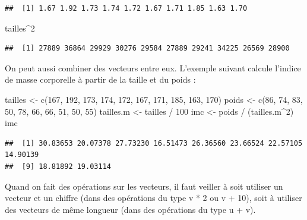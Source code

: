 \documentclass[
]{book}
\newenvironment{Shaded}{\begin{snugshade}}{\end{snugshade}}
\newcommand{\DecValTok}[1]{\textcolor[rgb]{0.00,0.00,0.81}{#1}}
\newcommand{\FunctionTok}[1]{\textcolor[rgb]{0.00,0.00,0.00}{#1}}
\newcommand{\NormalTok}[1]{#1}
\newcommand{\OtherTok}[1]{\textcolor[rgb]{0.56,0.35,0.01}{#1}}
\newcommand{\SpecialCharTok}[1]{\textcolor[rgb]{0.00,0.00,0.00}{#1}}
\begin{document}
\begin{verbatim}
##  [1] 1.67 1.92 1.73 1.74 1.72 1.67 1.71 1.85 1.63 1.70
\end{verbatim}

\begin{Shaded}
\begin{Highlighting}[]
\NormalTok{tailles}\SpecialCharTok{\^{}}\DecValTok{2}
\end{Highlighting}
\end{Shaded}

\begin{verbatim}
##  [1] 27889 36864 29929 30276 29584 27889 29241 34225 26569 28900
\end{verbatim}

On peut aussi combiner des vecteurs entre eux. L'exemple suivant calcule l'indice de masse corporelle à partir de la taille et du poids :

\begin{Shaded}
\begin{Highlighting}[]
\NormalTok{tailles }\OtherTok{\textless{}{-}} \FunctionTok{c}\NormalTok{(}\DecValTok{167}\NormalTok{, }\DecValTok{192}\NormalTok{, }\DecValTok{173}\NormalTok{, }\DecValTok{174}\NormalTok{, }\DecValTok{172}\NormalTok{, }\DecValTok{167}\NormalTok{, }\DecValTok{171}\NormalTok{, }\DecValTok{185}\NormalTok{, }\DecValTok{163}\NormalTok{, }\DecValTok{170}\NormalTok{)}
\NormalTok{poids }\OtherTok{\textless{}{-}} \FunctionTok{c}\NormalTok{(}\DecValTok{86}\NormalTok{, }\DecValTok{74}\NormalTok{, }\DecValTok{83}\NormalTok{, }\DecValTok{50}\NormalTok{, }\DecValTok{78}\NormalTok{, }\DecValTok{66}\NormalTok{, }\DecValTok{66}\NormalTok{, }\DecValTok{51}\NormalTok{, }\DecValTok{50}\NormalTok{, }\DecValTok{55}\NormalTok{)}
\NormalTok{tailles.m }\OtherTok{\textless{}{-}}\NormalTok{ tailles }\SpecialCharTok{/} \DecValTok{100}
\NormalTok{imc }\OtherTok{\textless{}{-}}\NormalTok{ poids }\SpecialCharTok{/}\NormalTok{ (tailles.m}\SpecialCharTok{\^{}}\DecValTok{2}\NormalTok{)}
\NormalTok{imc}
\end{Highlighting}
\end{Shaded}

\begin{verbatim}
##  [1] 30.83653 20.07378 27.73230 16.51473 26.36560 23.66524 22.57105 14.90139
##  [9] 18.81892 19.03114
\end{verbatim}

Quand on fait des opérations sur les vecteurs, il faut veiller à soit utiliser un vecteur et un chiffre (dans des opérations du type v * 2 ou v + 10), soit à utiliser des vecteurs de même longueur (dans des opérations du type u + v).
\end{document}
